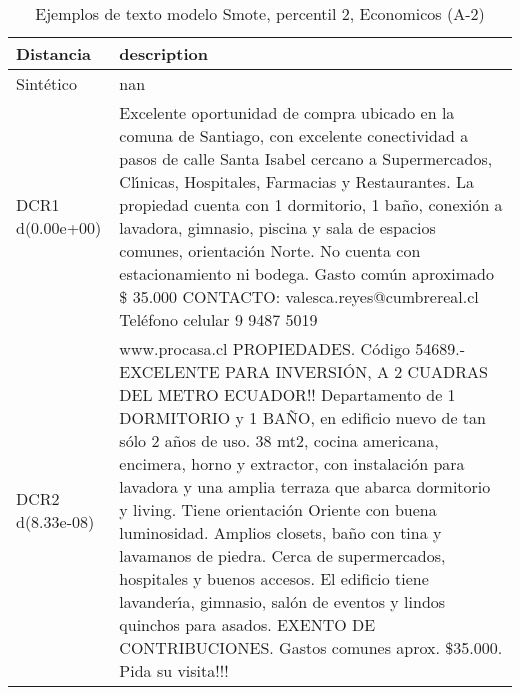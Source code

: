 \begin{table}[H]
\centering
\fontsize{10}{14}\selectfont
\caption{Ejemplos de texto modelo Smote, percentil 2, Economicos (A-2)}
\label{table-example-economicos-a-2-smote-enc-2p-text}
\begin{tabular}{|l|m{35em}|}
\hline
\rowcolor[gray]{0.8}
Distancia & description \\
\hline Sintético & nan \\
\hline DCR1 d(0.00e+00) & Excelente oportunidad de compra ubicado en la comuna de Santiago, con excelente conectividad a pasos de calle Santa Isabel cercano a Supermercados, Cl{\'\i}nicas, Hospitales, Farmacias y Restaurantes. La propiedad cuenta con 1 dormitorio, 1 ba\~no, conexi\'on a lavadora, gimnasio, piscina y sala de espacios comunes, orientaci\'on Norte.
 No cuenta con estacionamiento ni bodega. Gasto com\'un aproximado \$ 35.000 CONTACTO: valesca.reyes@cumbrereal.cl Tel\'efono celular 9 9487 5019 \\
\hline DCR2 d(8.33e-08) & www.procasa.cl    PROPIEDADES. C\'odigo 54689.- EXCELENTE PARA INVERSI\'ON, A 2 CUADRAS DEL METRO ECUADOR!! Departamento de 1 DORMITORIO y 1 BA\~NO, en edificio nuevo de tan s\'olo 2 a\~nos de uso. 38 mt2, cocina americana, encimera, horno y extractor, con instalaci\'on para lavadora y una amplia terraza que abarca dormitorio y living. Tiene orientaci\'on Oriente con buena luminosidad. Amplios closets, ba\~no con tina y lavamanos de piedra. Cerca de supermercados, hospitales y buenos accesos. El edificio tiene lavander{\'\i}a, gimnasio, sal\'on de eventos y lindos quinchos para asados.   EXENTO DE CONTRIBUCIONES. Gastos comunes aprox. \$35.000.  Pida su visita!!! \\
\hline
\end{tabular}
\end{table}
